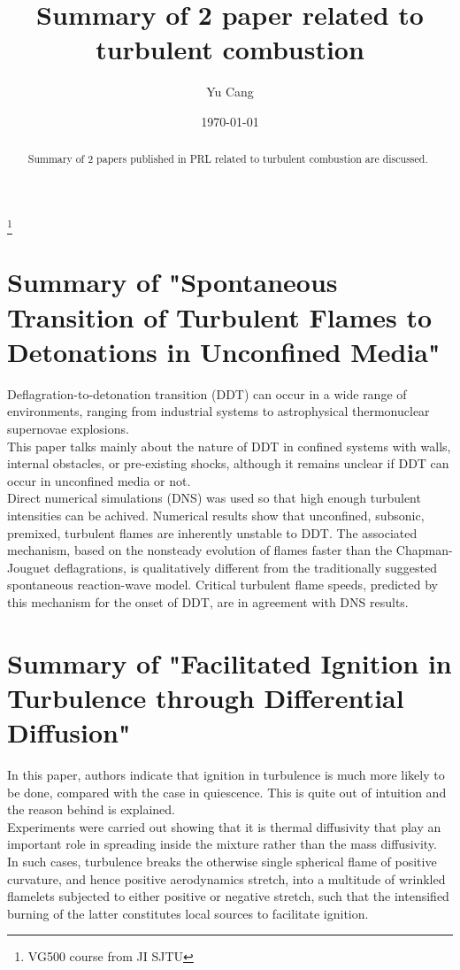 \documentclass[%
 reprint,
 amsmath,amssymb,
 aps,
]{revtex4-1}
\begin{document}

\title{Summary of 2 paper related to turbulent combustion}%
\thanks{VG500 course from JI SJTU}%

\author{Yu Cang}
\date{\today}

\begin{abstract}
	Summary of 2 papers published in PRL related to turbulent combustion are discussed.
\end{abstract}

\maketitle


\section{Summary of "Spontaneous Transition of Turbulent Flames to Detonations in Unconfined Media"}

Deflagration-to-detonation transition (DDT) can occur in a wide range of environments, ranging from industrial systems to astrophysical thermonuclear supernovae explosions. \\
This paper talks mainly about the nature of DDT in confined systems with walls, internal obstacles, or pre-existing shocks, although it remains unclear if DDT can occur in unconfined media or not.\\
Direct numerical simulations (DNS) was used so that high enough turbulent intensities can be achived. Numerical results show that unconfined, subsonic, premixed, turbulent flames are inherently unstable to DDT. The associated mechanism, based on the nonsteady evolution of flames faster than the Chapman-Jouguet deflagrations, is qualitatively different from the traditionally suggested spontaneous reaction-wave model. Critical turbulent flame speeds, predicted by this mechanism for the onset of DDT, are in agreement with DNS results.

\section{Summary of "Facilitated Ignition in Turbulence through Differential Diffusion"}
In this paper, authors indicate that ignition in turbulence is much more likely to be done, compared with the case in quiescence. This is quite out of intuition and the reason behind is explained. \\
Experiments were carried out showing that it is thermal diffusivity that play an important role in spreading inside the mixture rather than the mass diffusivity. \\
In such cases, turbulence breaks the otherwise single spherical flame of positive curvature, and hence positive aerodynamics stretch, into a multitude of wrinkled flamelets subjected to either positive or negative stretch, such that the intensified burning of the latter constitutes local sources to facilitate ignition.
\end{document}
